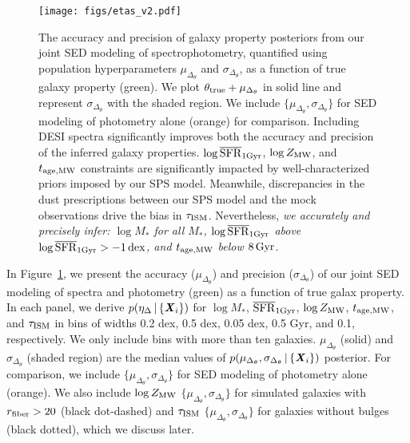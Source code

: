 \begin{figure}
\begin{center}
    \texttt{[image: figs/etas\_v2.pdf]}
    \caption{
        The accuracy and precision of galaxy property posteriors from our
        joint SED modeling of spectrophotometry, quantified using population
        hyperparameters $\mu_{\Delta_{\theta}}$ and $\sigma_{\Delta_{\theta}}$,
        as a function of true galaxy property (green). 
        We plot $\theta_{\rm true} + \mu_{\Delta_{\theta}}$ in solid line and
        represent $\sigma_{\Delta_{\theta}}$ with the shaded region.
        We include $\{\mu_{\Delta_{\theta}}, \sigma_{\Delta_{\theta}}\}$ for SED
        modeling of photometry alone (orange) for comparison. 
        Including DESI spectra significantly improves both the accuracy and
        precision of the inferred galaxy properties. 
        $\log\overline{\rm SFR}_{\rm 1Gyr}$, $\log Z_{\rm MW}$, and $t_{\rm age, MW}$ constraints are significantly
        impacted by well-characterized priors imposed by our SPS model.
        Meanwhile, discrepancies in the dust prescriptions between our SPS
        model and the mock observations drive the bias in $\tau_{\rm ISM}$.
        Nevertheless, \emph{
            we accurately and precisely infer: 
            $\log M_*$ for all $M_*$, $\log\overline{\rm SFR}_{\rm 1Gyr}$ above $\log\overline{\rm SFR}_{\rm 1Gyr} > -1\,{\rm
            dex}$, and $t_{\rm age, MW}$ below $8\,{\rm Gyr}$.
        }
        } \label{fig:etas}
\end{center}
\end{figure}

In Figure~\ref{fig:etas}, we present the accuracy ($\mu_{\Delta_{\theta}}$) and
precision ($\sigma_{\Delta_{\theta}}$) of our joint SED modeling of spectra and
photometry (green) as a function of true galax property. 
In each panel, we derive $p(\eta_\Delta \,|\, \{{\textbf{\textit{X}}_i}\})$ for 
$\log M_*$, $\overline{\rm SFR}_{\rm 1Gyr}$, $\log Z_{\rm MW}$, $t_{\rm age, MW}$, and $\tau_{\rm ISM}$ in bins of
widths 0.2 dex, 0.5 dex, 0.05 dex, 0.5 Gyr, and 0.1, respectively. 
We only include bins with more than ten galaxies. 
$\mu_{\Delta_{\theta}}$ (solid) and $\sigma_{\Delta_{\theta}}$ (shaded region)
are the median values of $p(\mu_{\Delta_{\theta}}, \sigma_{\Delta_{\theta}}
\,|\, \{{\textbf{\textit{X}}_i}\})$ posterior. 
For comparison, we include $\{\mu_{\Delta_{\theta}},
\sigma_{\Delta_{\theta}}\}$ for SED modeling of photometry alone (orange).
We also include $\log Z_{\rm MW}$ $\{\mu_{\Delta_\theta}, \sigma_{\Delta_\theta}\}$
for simulated galaxies with $r_{\rm fiber} > 20$ (black dot-dashed) and
$\tau_{\rm ISM}$ $\{\mu_{\Delta_\theta}, \sigma_{\Delta_\theta}\}$ for galaxies
without bulges (black dotted), which we discuss later. 

